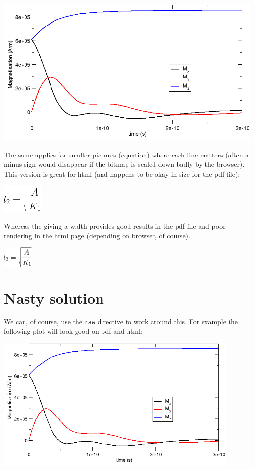 \documentclass[10pt,a4paper,english]{article}
\begin{document}
{\hfill\includegraphics[width=15cm]{data_M.png}\hfill}

The same applies for smaller pictures (equation) where each line
matters (often a minus sign would disappear if the bitmap is scaled
down badly by the browser). This version is great for html (and
happens to be okay in size for the pdf file):

{\hfill\includegraphics{l_ex_hard.png}\hfill}

Whereas the giving a width provides good results in the pdf file and
poor rendering in the html page (depending on browser, of course).

{\hfill\includegraphics[width=1.5cm]{l_ex_hard.png}\hfill}



\hypertarget{nasty-solution}{}
\section*{Nasty solution}

We can, of course, use the \texttt{raw} directive to work around this. For
example the following plot will look good on pdf and html:
%

{ \hfill\includegraphics[width=0.9\textwidth]{data_M.png}\hfill}
\end{document}
